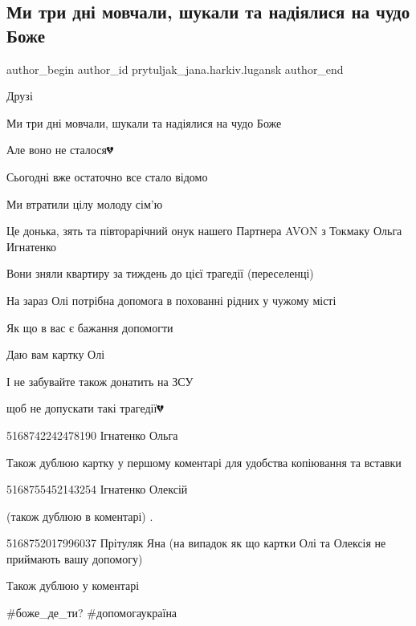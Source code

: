 
 
 
 
 

\subsection{Ми три дні мовчали, шукали та надіялися на чудо Боже}
\label{sec:17_01_2023.fb.prytuljak_jana.harkiv.lugansk.1.mi_tri_dn__movchali_}

\ifcmt
 author_begin
   author_id prytuljak_jana.harkiv.lugansk
 author_end
\fi

Друзі

Ми три дні мовчали, шукали та надіялися на чудо Боже

Але воно не сталося💔

Сьогодні вже остаточно все стало відомо 

Ми втратили цілу молоду сім'ю

Це донька, зять та півторарічний онук нашего Партнера AVON з Токмаку Ольга Игнатенко

Вони зняли квартиру за тиждень до цієї трагедії (переселенці)

На зараз Олі потрібна допомога в похованні рідних у чужому місті

Як що в вас є бажання допомогти

Даю вам картку Олі

І не забувайте також донатить на ЗСУ

щоб не допускати такі трагедії💔

5168742242478190 Ігнатенко Ольга

Також дублюю картку у першому коментарі для удобства копіювання та вставки

5168755452143254 Ігнатенко Олексій

(також дублюю в коментарі) .

5168752017996037 Прітуляк Яна (на випадок як що картки Олі та Олексія не приймають вашу допомогу)

Також дублюю у коментарі

\#боже\_де\_ти? \#допомогаукраїна
